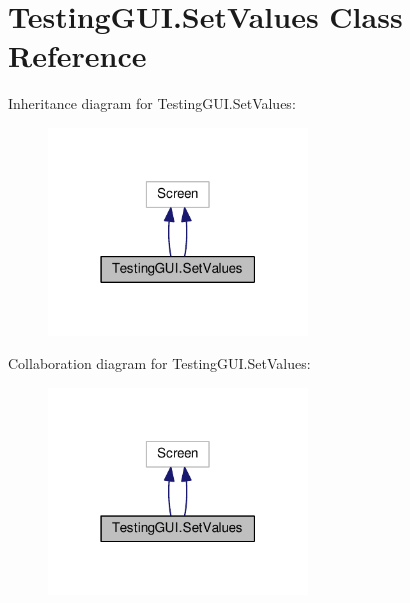 \hypertarget{classTestingGUI_1_1SetValues}{}\section{Testing\+G\+U\+I.\+Set\+Values Class Reference}
\label{classTestingGUI_1_1SetValues}


Inheritance diagram for Testing\+G\+U\+I.\+Set\+Values\+:\nopagebreak
\begin{figure}[H]
\begin{center}
\leavevmode
\includegraphics[width=195pt]{classTestingGUI_1_1SetValues__inherit__graph}
\end{center}
\end{figure}


Collaboration diagram for Testing\+G\+U\+I.\+Set\+Values\+:\nopagebreak
\begin{figure}[H]
\begin{center}
\leavevmode
\includegraphics[width=195pt]{classTestingGUI_1_1SetValues__coll__graph}
\end{center}
\end{figure}
